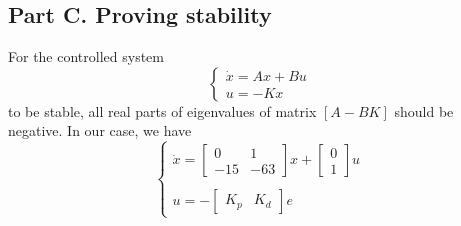 \documentclass[a4paper,12pt]{article}
\begin{document}
    \subsection*{Part C. Proving stability}
        For the controlled system 
        \begin{equation*}
            \begin{cases}
                \dot{x}=Ax+Bu\\
                u = -Kx
            \end{cases}
        \end{equation*}
        to be stable, all real parts of eigenvalues of matrix $[A-BK]$ should be
        negative. In our case, we have
        \begin{equation*}
            \begin{cases}
                \dot{x}=
                \begin{bmatrix}
                    0 & 1 \\
                    -15 & -63
                \end{bmatrix}
                x+
                \begin{bmatrix}
                    0 \\
                    1
                \end{bmatrix}
                u
                \\
                \\
                u = -
                \begin{bmatrix}
                    K_p & K_d
                \end{bmatrix}
                e
            \end{cases}
        \end{equation*}
\end{document}
